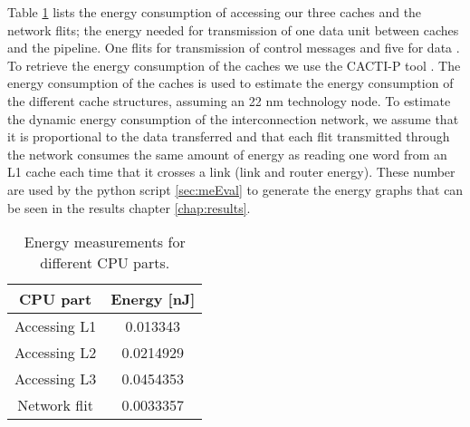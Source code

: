 Table \ref{tab:energy} lists the energy consumption of accessing our three caches and the network
flits; the energy needed for transmission of one data unit between caches and
the pipeline. One flits for transmission of control messages and five for data \cite{thePaper}.
To retrieve the energy consumption of the caches we use the CACTI-P tool \cite{energy2}. The energy consumption of the caches is used to
estimate the energy consumption of the different cache structures, assuming an 22 nm
technology node. To estimate the dynamic energy consumption of the interconnection
network, we assume that it is proportional to the data transferred \cite{energy} and that each
flit transmitted through the network consumes the same amount of energy as reading
one word from an L1 cache each time that it crosses a link (link and router energy).
These number are used by the python script \ref{sec:meEval} to generate the energy graphs that can be seen in the results chapter \ref{chap:results}.
\begin{table}[h]
    \begin{centering}
        \begin{tabular}{ |c|c| }
            \hline
            CPU part & Energy [nJ] \\ \hline
            Accessing L1 & 0.013343 \\ \hline
            Accessing L2 & 0.0214929 \\ \hline
            Accessing L3 & 0.0454353 \\ \hline
            Network flit & 0.0033357 \\ \hline
        \end{tabular}
        \caption{Energy measurements for different CPU parts.}
        \label{tab:energy}
    \end{centering}
\end{table}







